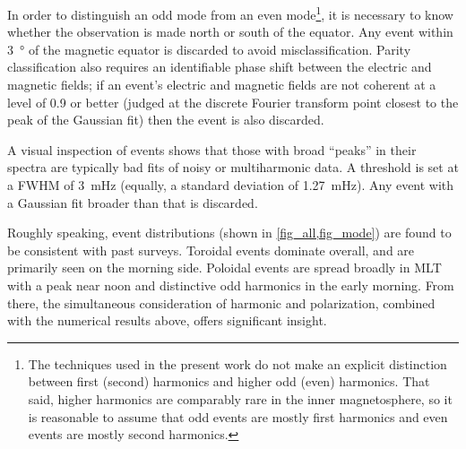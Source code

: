\documentclass[draft,linenumbers]{agujournal}
\begin{document}
In order to distinguish an odd mode from an even mode\footnote{
The techniques used in the present work do not make an explicit distinction between first (second) harmonics and higher odd (even) harmonics. That said, higher harmonics are comparably rare in the inner magnetosphere, so it is reasonable to assume that odd events are mostly first harmonics and even events are mostly second harmonics.}, it is necessary to know whether the observation is made north or south of the equator. Any event within \SI{3}{\degree} of the magnetic equator is discarded to avoid misclassification. Parity classification also requires an identifiable phase shift between the electric and magnetic fields; if an event's electric and magnetic fields are not coherent at a level of 0.9 or better (judged at the discrete Fourier transform point closest to the peak of the Gaussian fit) then the event is also discarded.

A visual inspection of events shows that those with broad ``peaks'' in their spectra are typically bad fits of noisy or multiharmonic data. A threshold is set at a FWHM of \SI{3}{\mHz} (equally, a standard deviation of \SI{1.27}{\mHz}). Any event with a Gaussian fit broader than that is discarded.

Roughly speaking, event distributions (shown in \cref{fig_all,fig_mode}) are found to be consistent with past surveys. Toroidal events dominate overall, and are primarily seen on the morning side. Poloidal events are spread broadly in MLT with a peak near noon and distinctive odd harmonics in the early morning. From there, the simultaneous consideration of harmonic and polarization, combined with the numerical results above, offers significant insight.
\end{document}
